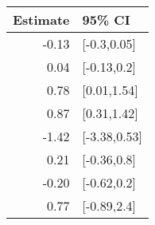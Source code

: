 \begin{tabular}{rl}
  \hline
Estimate & 95\% CI \\ 
  \hline
-0.13 & [-0.3,0.05] \\ 
  0.04 & [-0.13,0.2] \\ 
  0.78 & [0.01,1.54] \\ 
  0.87 & [0.31,1.42] \\ 
  -1.42 & [-3.38,0.53] \\ 
  0.21 & [-0.36,0.8] \\ 
  -0.20 & [-0.62,0.2] \\ 
  0.77 & [-0.89,2.4] \\ 
   \hline
\end{tabular}

